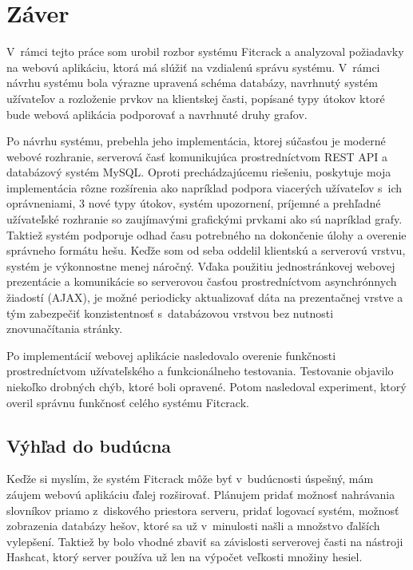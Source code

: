 \documentclass[slovak]{fitthesis}
\begin{document}
\chapter{Záver}\label{zaver}
V~rámci tejto práce som urobil rozbor systému Fitcrack a analyzoval požiadavky na webovú aplikáciu, ktorá má slúžiť na vzdialenú správu systému. V~rámci návrhu systému bola výrazne upravená schéma databázy, navrhnutý systém užívateľov a rozloženie prvkov na klientskej časti, popísané typy útokov ktoré bude webová aplikácia podporovať a navrhnuté druhy grafov.

Po návrhu systému, prebehla jeho implementácia, ktorej súčasťou je moderné webové rozhranie, serverová časť komunikujúca prostredníctvom REST API a databázový systém MySQL. Oproti prechádzajúcemu riešeniu, poskytuje moja implementácia rôzne rozšírenia ako napríklad podpora viacerých užívateľov s~ich oprávneniami, 3 nové typy útokov, systém upozornení, príjemné a prehľadné užívateľské rozhranie so zaujímavými grafickými prvkami ako sú napríklad grafy. Taktiež systém podporuje odhad času potrebného na dokončenie úlohy a overenie správneho formátu hešu. Keďže som od seba oddelil klientskú a serverovú vrstvu, systém je výkonnostne menej náročný. Vďaka použitiu jednostránkovej webovej prezentácie a komunikácie so serverovou časťou prostredníctvom asynchrónnych žiadostí (AJAX), je možné periodicky aktualizovať dáta na prezentačnej vrstve a tým zabezpečiť konzistentnosť s~databázovou vrstvou bez nutnosti znovunačítania stránky.

Po implementácií webovej aplikácie nasledovalo overenie funkčnosti prostredníctvom užívateľského a funkcionálneho testovania. Testovanie objavilo niekoľko drobných chýb, ktoré boli opravené. Potom nasledoval experiment, ktorý overil správnu funkčnosť celého systému Fitcrack.


\section{Výhľad do budúcna}
Keďže si myslím, že systém Fitcrack môže byť v~budúcnosti úspešný, mám záujem webovú aplikáciu ďalej rozširovať. Plánujem pridať možnosť nahrávania slovníkov priamo z~diskového priestora serveru, pridať logovací systém, možnosť zobrazenia databázy hešov, ktoré sa už v~minulosti našli a množstvo ďalších vylepšení. Taktiež by bolo vhodné zbaviť sa závislosti serverovej časti na nástroji Hashcat, ktorý server používa už len na výpočet veľkosti množiny hesiel.
\end{document}
